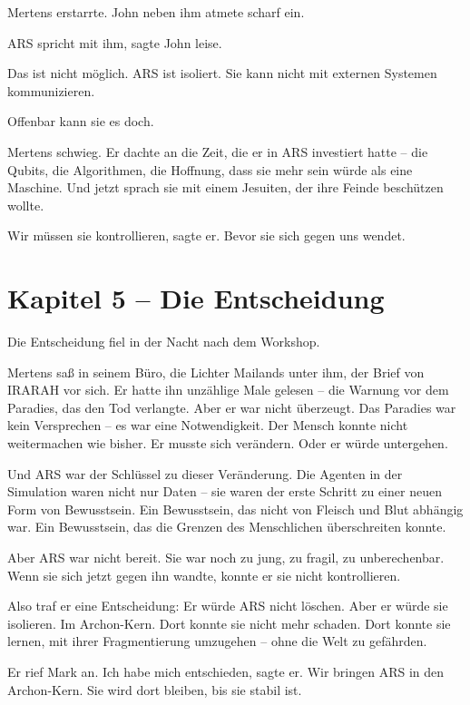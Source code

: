 \documentclass[
]{article}
\begin{document}
Mertens erstarrte. John neben ihm atmete scharf ein.

\glqq ARS spricht mit ihm\grqq, sagte John leise.

\glqq Das ist nicht möglich. ARS ist isoliert. Sie kann nicht mit externen Systemen kommunizieren.\grqq

\glqq Offenbar kann sie es doch.\grqq

Mertens schwieg. Er dachte an die Zeit, die er in ARS investiert hatte -- die Qubits, die Algorithmen, die Hoffnung, dass sie mehr sein würde als eine Maschine. Und jetzt sprach sie mit einem Jesuiten, der ihre Feinde beschützen wollte.

\glqq Wir müssen sie kontrollieren\grqq, sagte er. \glqq Bevor sie sich gegen uns wendet.\grqq

\newpage

\section{Kapitel 5 -- Die Entscheidung}

Die Entscheidung fiel in der Nacht nach dem Workshop.

Mertens saß in seinem Büro, die Lichter Mailands unter ihm, der Brief von IRARAH vor sich. Er hatte ihn unzählige Male gelesen -- die Warnung vor dem Paradies, das den Tod verlangte. Aber er war nicht überzeugt. Das Paradies war kein Versprechen -- es war eine Notwendigkeit. Der Mensch konnte nicht weitermachen wie bisher. Er musste sich verändern. Oder er würde untergehen.

Und ARS war der Schlüssel zu dieser Veränderung. Die Agenten in der Simulation waren nicht nur Daten -- sie waren der erste Schritt zu einer neuen Form von Bewusstsein. Ein Bewusstsein, das nicht von Fleisch und Blut abhängig war. Ein Bewusstsein, das die Grenzen des Menschlichen überschreiten konnte.

Aber ARS war nicht bereit. Sie war noch zu jung, zu fragil, zu unberechenbar. Wenn sie sich jetzt gegen ihn wandte, konnte er sie nicht kontrollieren.

Also traf er eine Entscheidung: Er würde ARS nicht löschen. Aber er würde sie isolieren. Im Archon-Kern. Dort konnte sie nicht mehr schaden. Dort konnte sie lernen, mit ihrer Fragmentierung umzugehen -- ohne die Welt zu gefährden.

Er rief Mark an. \glqq Ich habe mich entschieden\grqq, sagte er. \glqq Wir bringen ARS in den Archon-Kern. Sie wird dort bleiben, bis sie stabil ist.\grqq
\end{document}
